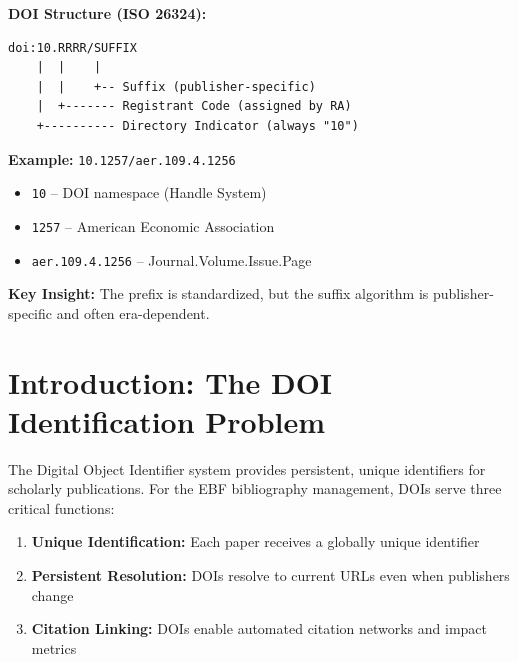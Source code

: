 \begin{tcolorbox}[colback=blue!5, colframe=blue!50, title=Quick Reference: DOI Fundamentals]
\small
\textbf{DOI Structure (ISO 26324):}
\begin{verbatim}
doi:10.RRRR/SUFFIX
    |  |    |
    |  |    +-- Suffix (publisher-specific)
    |  +------- Registrant Code (assigned by RA)
    +---------- Directory Indicator (always "10")
\end{verbatim}

\textbf{Example:} \texttt{10.1257/aer.109.4.1256}
\begin{itemize}[noitemsep]
    \item \texttt{10} -- DOI namespace (Handle System)
    \item \texttt{1257} -- American Economic Association
    \item \texttt{aer.109.4.1256} -- Journal.Volume.Issue.Page
\end{itemize}

\textbf{Key Insight:} The prefix is standardized, but the suffix algorithm is publisher-specific and often era-dependent.
\end{tcolorbox}

\section{Introduction: The DOI Identification Problem}
\label{sec:doi-intro}

The Digital Object Identifier system provides persistent, unique identifiers for scholarly publications. For the EBF bibliography management, DOIs serve three critical functions:

\begin{enumerate}
    \item \textbf{Unique Identification:} Each paper receives a globally unique identifier
    \item \textbf{Persistent Resolution:} DOIs resolve to current URLs even when publishers change
    \item \textbf{Citation Linking:} DOIs enable automated citation networks and impact metrics
\end{enumerate}

